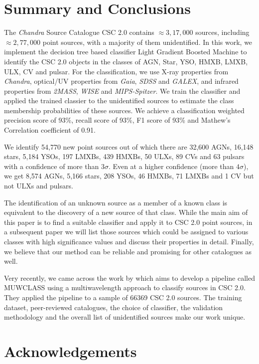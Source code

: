 \documentclass[fleqn,usenatbib]{mnras}
\begin{document}
\section{Summary and Conclusions}\label{sec:Summary}

The {\em Chandra} Source Catalogue CSC 2.0 contains $\approx 3,17,000$ sources, including $\approx 2,77,000$ point sources, with a majority of them unidentified. In this work, we implement the decision tree based classifier Light Gradient Boosted Machine to identify the CSC 2.0 objects in the classes of AGN, Star, YSO, HMXB, LMXB, ULX, CV and pulsar.  %
For the classification, we use X-ray properties from {\em Chandra}, optical/UV properties from {\em Gaia}, {\em SDSS} and {\em GALEX}, and infrared properties from {\em 2MASS}, {\em WISE} and {\em MIPS-Spitzer}. We train the classifier and applied the trained classier to the unidentified sources to estimate the class membership probabilities of these sources. We achieve a classification weighted precision score of 93\%, recall score of 93\%, F1 score of 93\% and Mathew's Correlation coefficient of 0.91. 

We identify 54,770 new point sources out of which there are 32,600 AGNs, 16,148 stars, 5,184 YSOs, 197 LMXBs, 439 HMXBs, 50 ULXs, 89 CVs and 63 pulsars with a confidence of more than $3\sigma$. Even at a higher confidence (more than $4\sigma$), we get 8,574 AGNs, 5,166 stars, 208 YSOs, 46 HMXBs, 71 LMXBs and 1 CV but not ULXs and pulsars.

The identification of an unknown source as a member of a known class is equivalent to the discovery of a new source of that class.
While the main aim of this paper is to find a suitable classifier and apply it to CSC 2.0 point sources, in a subsequent paper we will  list those  sources which could be assigned to various classes with high significance values and discuss their properties in detail. Finally, we believe that our method can be reliable and promising for other catalogues as well.

Very recently, we came across the work by \cite{2022ApJ...941..104Y} which
aims to develop a pipeline called MUWCLASS using a multiwavelength approach to classify sources in CSC 2.0. They applied the pipeline to a sample of 66369 CSC 2.0 sources. The training dataset, peer-reviewed catalogues, the choice of
classifier, the validation methodology and the overall list of
unidentified sources make our work unique.

\section*{Acknowledgements}
\end{document}
